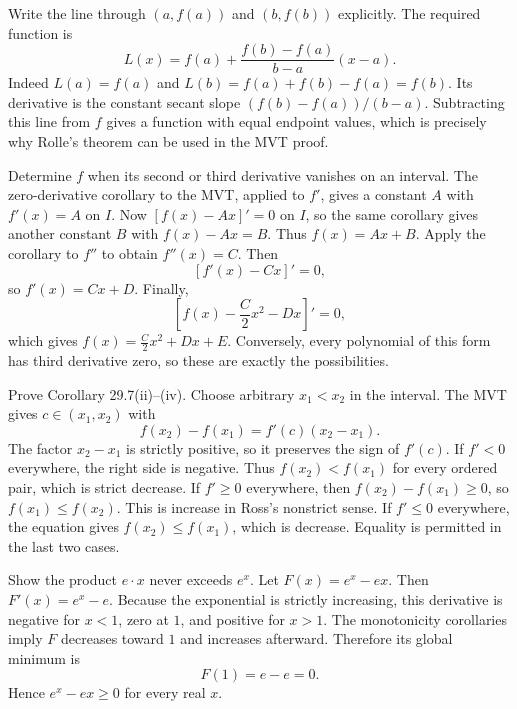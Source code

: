 \goal Write the line through $(a,f(a))$ and $(b,f(b))$ explicitly.
The required function is
\[
 L(x)=f(a)+\frac{f(b)-f(a)}{b-a}(x-a).
\]
Indeed $L(a)=f(a)$ and $L(b)=f(a)+f(b)-f(a)=f(b)$. Its derivative is the constant secant slope $(f(b)-f(a))/(b-a)$. Subtracting this line from $f$ gives a function with equal endpoint values, which is precisely why Rolle's theorem can be used in the MVT proof.

\goal Determine $f$ when its second or third derivative vanishes on an interval.
The zero-derivative corollary to the MVT, applied to $f'$, gives a constant $A$ with $f'(x)=A$ on $I$. Now $[f(x)-Ax]'=0$ on $I$, so the same corollary gives another constant $B$ with $f(x)-Ax=B$. Thus $f(x)=Ax+B$.
Apply the corollary to $f''$ to obtain $f''(x)=C$. Then
\[
 [f'(x)-Cx]'=0,
\]
so $f'(x)=Cx+D$. Finally,
\[
 \left[f(x)-\frac C2x^2-Dx\right]'=0,
\]
which gives $f(x)=\tfrac C2x^2+Dx+E$. Conversely, every polynomial of this form has third derivative zero, so these are exactly the possibilities.

\goal Prove Corollary 29.7(ii)--(iv).
Choose arbitrary $x_1<x_2$ in the interval. The MVT gives $c\in(x_1,x_2)$ with
\[
 f(x_2)-f(x_1)=f'(c)(x_2-x_1).
\]
The factor $x_2-x_1$ is strictly positive, so it preserves the sign of $f'(c)$.
If $f'<0$ everywhere, the right side is negative. Thus $f(x_2)<f(x_1)$ for every ordered pair, which is strict decrease.
If $f'\ge0$ everywhere, then $f(x_2)-f(x_1)\ge0$, so $f(x_1)\le f(x_2)$. This is increase in Ross's nonstrict sense.
If $f'\le0$ everywhere, the equation gives $f(x_2)\le f(x_1)$, which is decrease. Equality is permitted in the last two cases.

\goal Show the product $e\cdot x$ never exceeds $e^x$.
Let $F(x)=e^x-ex$. Then $F'(x)=e^x-e$. Because the exponential is strictly increasing, this derivative is negative for $x<1$, zero at $1$, and positive for $x>1$. The monotonicity corollaries imply $F$ decreases toward $1$ and increases afterward. Therefore its global minimum is
\[
 F(1)=e-e=0.
\]
Hence $e^x-ex\ge0$ for every real $x$.


